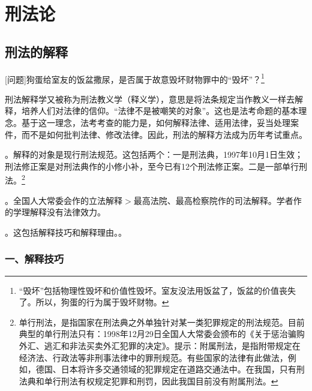 \chapter{刑法论}

\begin{EditionOpeningPanel}
\end{EditionOpeningPanel}

\section{刑法的解释}

[问题]狗蛋给室友的饭盆撒尿，是否属于故意毁坏财物罪中的“毁坏”？\footnote{“毁坏”包括物理性毁坏和价值性毁坏。室友没法用饭盆了，饭盆的价值丧失了。所以，狗蛋的行为属于毁坏财物。}


刑法解释学又被称为刑法教义学（释义学），意思是将法条规定当作教义一样去解释，培养人们对法律的信仰。“法律不是被嘲笑的对象”。这也是法考命题的基本理念。基于这一理念，法考考查的能力是，如何解释法律、适用法律，妥当处理案件，而不是如何批判法律、修改法律。因此，刑法的解释方法成为历年考试重点。

。解释的对象是现行刑法规范。这包括两个：一是刑法典，1997年10月1日生效；刑法修正案是对刑法典作的小修小补，至今已有12个刑法修正案。二是一部单行刑法。\footnote{单行刑法，是指国家在刑法典之外单独针对某一类犯罪规定的刑法规范。目前典型的单行刑法只有：1998年12月29日全国人大常委会颁布的《关于惩治骗购外汇、逃汇和非法买卖外汇犯罪的决定》。提示：附属刑法，是指附带规定在经济法、行政法等非刑事法律中的罪刑规范。有些国家的法律有此做法，例如，德国、日本将许多交通领域的犯罪规定在道路交通法中。在我国，只有刑法典和单行刑法有权规定犯罪和刑罚，因此我国目前没有附属刑法。}

。全国人大常委会作的立法解释\ensuremath{>}最高法院、最高检察院作的司法解释。学者作的学理解释没有法律效力。

。这包括解释技巧和解释理由。。

\subsection*{一、解释技巧}

